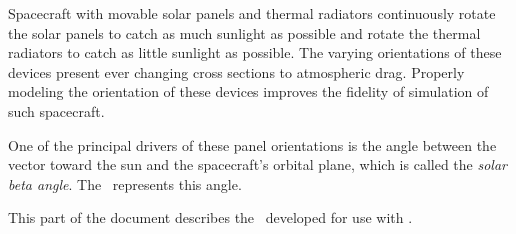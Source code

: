 %
%
% 
%



Spacecraft with movable solar panels and thermal radiators
continuously rotate the solar panels to catch as much sunlight as possible
and rotate the thermal radiators to catch as little sunlight as possible.
The varying orientations of these devices present ever changing cross sections
to atmospheric drag. Properly modeling the orientation of these devices
improves the fidelity of simulation of such spacecraft.

One of the principal drivers of these panel orientations is the angle between
the vector toward the sun and the spacecraft's orbital plane, which is called
the {\em solar beta angle}. The \SolarBetaDesc\ represents this angle.

This part of the document describes the \SolarBetaDesc\ developed for use with \JEODid.













